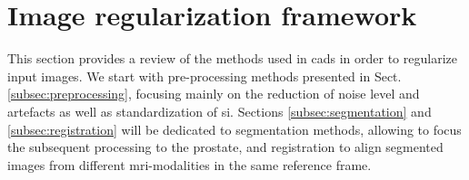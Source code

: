 \section{Image regularization framework} \label{sec:imaprocfra}

This section provides a review of the methods used in \acp{cad} in order to regularize input images. We start with pre-processing methods presented in Sect. \ref{subsec:preprocessing}, focusing mainly on the reduction of noise level and artefacts as well as standardization of \ac{si}. Sections \ref{subsec:segmentation} and \ref{subsec:registration} will be dedicated to segmentation methods, allowing to focus the subsequent processing to the prostate, and registration to align segmented images from different \ac{mri}-modalities in the same reference frame.






